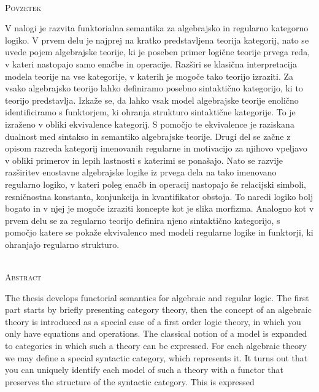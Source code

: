 \documentclass[../kategoricna_logika.tex]{subfiles}
\begin{document}
\begin{center}
\textbf{\naslovdela} \\[3mm]
\textsc{Povzetek} \\[2mm]
\end{center}
V nalogi je razvita funktorialna semantika za algebrajsko in regularno kategorno logiko.
V prvem delu je najprej na kratko predstavljena teorija kategorij, nato se uvede
pojem algebrajske teorije, ki je poseben primer logične teorije prvega reda, v kateri
nastopajo samo enačbe in operacije. Razširi se klasična interpretacija modela teorije
na vse kategorije, v katerih je mogoče tako teorijo izraziti.
Za vsako algebrajsko teorijo lahko definiramo posebno sintaktično kategorijo,
ki to teorijo predstavlja. Izkaže se, da lahko vsak model algebrajske teorije
enolično identificiramo s funktorjem, ki ohranja strukturo sintaktične kategorije.
To je izraženo v obliki ekvivalence kategorij. S pomočjo te ekvivalence je raziskana
dualnost med sintakso in semantiko algebrajske teorije.
Drugi del se začne z opisom razreda kategorij imenovanih regularne in motivacijo
za njihovo vpeljavo v obliki primerov in lepih lastnosti s katerimi se ponašajo.
Nato se razvije razširitev enostavne algebrajske logike iz prvega dela na tako imenovano
regularno logiko, v kateri poleg enačb in operacij nastopajo še relacijski simboli,
resničnostna konstanta, konjunkcija in kvantifikator obstoja. To naredi logiko
bolj bogato in v njej je mogoče izraziti koncepte kot je slika morfizma.
Analogno kot v prvem delu se za regularno teorijo definira njeno sintaktično kategorijo,
s pomočjo katere se pokaže ekvivalenco med modeli regularne logike in funktorji, ki
ohranjajo regularno strukturo.
\vfill
\begin{center}
\textbf{\ttitleEn} \\[3mm] %
\textsc{Abstract}\\[2mm]
\end{center}
The thesis develops functorial semantics for algebraic and regular logic.
The first part starts by briefly presenting category theory, then the concept of
an algebraic theory is introduced as a special case of a first order logic theory,
in which you only have equations and operations. The classical notion of a model
is expanded to categories in which such a theory can be expressed.
For each algebraic theory we may define a special syntactic category, which represents
it. It turns out that you can uniquely identify each model of such a theory with a
functor that preserves the structure of the syntactic category. This is expressed
\end{document}
